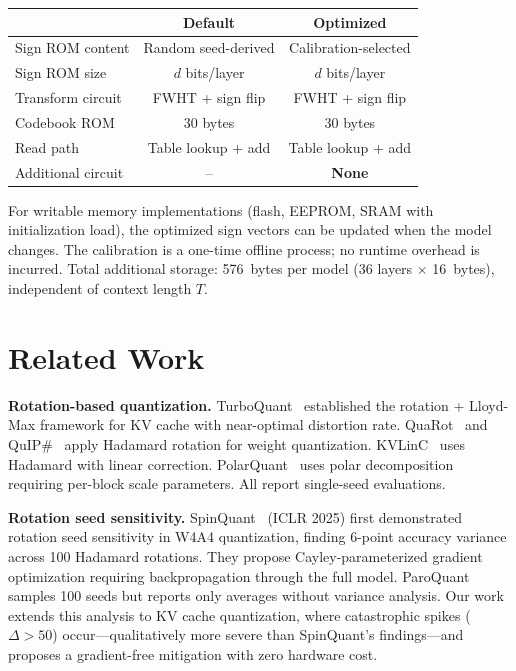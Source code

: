 \documentclass[conference]{IEEEtran}
\begin{document}
\begin{table}[h]
\centering
\setlength{\tabcolsep}{4pt}
\footnotesize
\begin{tabular}{lcc}
\toprule
& \textbf{Default} & \textbf{Optimized} \\
\midrule
Sign ROM content & Random seed-derived & Calibration-selected \\
Sign ROM size & $d$ bits/layer & $d$ bits/layer \\
Transform circuit & FWHT + sign flip & FWHT + sign flip \\
Codebook ROM & 30 bytes & 30 bytes \\
Read path & Table lookup + add & Table lookup + add \\
Additional circuit & -- & \textbf{None} \\
\bottomrule
\end{tabular}
\end{table}

For writable memory implementations (flash, EEPROM, SRAM with initialization load), the optimized sign vectors can be updated when the model changes.
The calibration is a one-time offline process; no runtime overhead is incurred.
Total additional storage: 576~bytes per model (36 layers $\times$ 16~bytes), independent of context length $T$.

\section{Related Work}
\label{sec:related}

\textbf{Rotation-based quantization.}
TurboQuant~\cite{turboquant} established the rotation + Lloyd-Max framework for KV cache with near-optimal distortion rate.
QuaRot~\cite{quarot} and QuIP\#~\cite{quipsharp} apply Hadamard rotation for weight quantization.
KVLinC~\cite{kvlinc} uses Hadamard with linear correction.
PolarQuant~\cite{polarquant} uses polar decomposition requiring per-block scale parameters.
All report single-seed evaluations.

\textbf{Rotation seed sensitivity.}
SpinQuant~\cite{spinquant} (ICLR 2025) first demonstrated rotation seed sensitivity in W4A4 quantization, finding 6-point accuracy variance across 100 Hadamard rotations.
They propose Cayley-parameterized gradient optimization requiring backpropagation through the full model.
ParoQuant~\cite{paroquant} samples 100 seeds but reports only averages without variance analysis.
Our work extends this analysis to KV cache quantization, where catastrophic spikes ($\Delta > 50$) occur---qualitatively more severe than SpinQuant's findings---and proposes a gradient-free mitigation with zero hardware cost.
\end{document}
